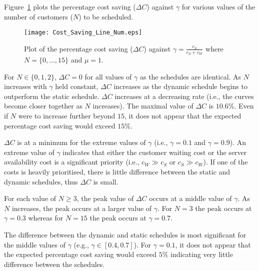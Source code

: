 Figure~\ref{Graph_Cost_Saving} plots the percentage cost saving ($\Delta C$) against $\gamma$ for various values of the number of customers ($N$) to be scheduled. 
\begin{figure}[htb]
	\centering
	\texttt{[image: Cost\_Saving\_Line\_Num.eps]}
	\caption{Plot of the percentage cost saving ($\Delta C$) against $\gamma = \frac{c_{S}}{c_{S} + c_{W}}$ where $N = \{ 0, \ldots, 15 \}$ and $\mu = 1$.}
	\label{Graph_Cost_Saving}
\end{figure}

For $N \in \{ 0, 1, 2 \}$, $\Delta C = 0$ for all values of $\gamma$ as the schedules are identical. As $N$ increases with $\gamma$ held constant, $\Delta C$ increases as the dynamic schedule begins to outperform the static schedule. $\Delta C$ increases at a decreasing rate (i.e., the curves become closer together as $N$ increases). The maximal value of $\Delta C$ is $10.6 \%$. Even if $N$ were to increase further beyond $15$, it does not appear that the expected percentage cost saving would exceed $15 \%$.

$\Delta C$ is at a minimum for the extreme values of $\gamma$ (i.e., $\gamma = 0.1$ and $\gamma = 0.9$). An extreme value of $\gamma$ indicates that either the customer waiting cost or the server availability cost is a significant priority (i.e., $c_{W} \gg c_{S}$ or $c_{S} \gg c_{W}$). If one of the costs is heavily prioritised, there is little difference between the static and dynamic schedules, thus $\Delta C$ is small.

For each value of $N \geq 3$, the peak value of $\Delta C$ occurs at a middle value of $\gamma$. As $N$ increases, the peak occurs at a larger value of $\gamma$. For $N = 3$ the peak occurs at $\gamma = 0.3$ whereas for $N = 15$ the peak occurs at $\gamma = 0.7$.

The difference between the dynamic and static schedules is most significant for the middle values of $\gamma$ (e.g., $\gamma \in [0.4, 0.7]$). For $\gamma = 0.1$, it does not appear that the expected percentage cost saving would exceed $5 \%$ indicating very little difference between the schedules.